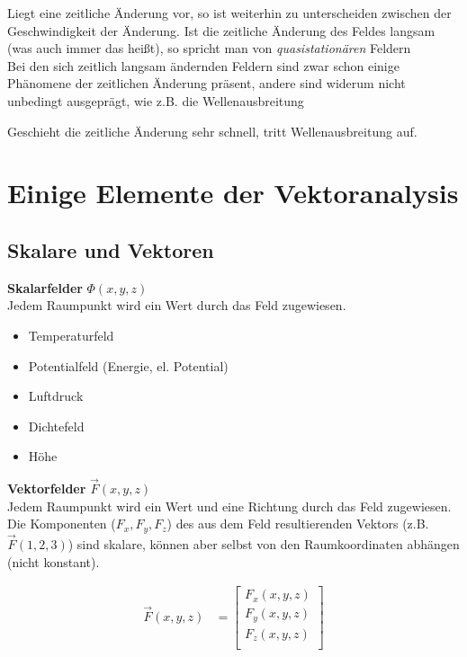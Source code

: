 \documentclass[11pt, a4paper]{article}
\begin{document}
Liegt eine zeitliche Änderung vor, so ist weiterhin zu unterscheiden zwischen der Geschwindigkeit der Änderung. Ist die zeitliche Änderung des Feldes langsam (was auch immer das heißt), so spricht man von \emph{quasistationären} Feldern\\

Bei den sich zeitlich langsam ändernden Feldern sind zwar schon einige Phänomene der zeitlichen Änderung präsent, andere sind widerum nicht unbedingt ausgeprägt, wie z.B.
die Wellenausbreitung

Geschieht die zeitliche Änderung sehr schnell, tritt Wellenausbreitung auf.

\section{Einige Elemente der Vektoranalysis}
\subsection{Skalare und Vektoren}

\textbf{Skalarfelder} $\Phi(x,y,z)$\\
Jedem Raumpunkt wird ein Wert durch das Feld zugewiesen.
\begin{itemize}
  \item Temperaturfeld
  \item Potentialfeld (Energie, el. Potential)
  \item Luftdruck
  \item Dichtefeld
  \item Höhe
\end{itemize}

\noindent \textbf{Vektorfelder} $\vec{F}(x,y,z)$\\
Jedem Raumpunkt wird ein Wert und eine Richtung durch das Feld zugewiesen.
Die Komponenten ($F_{x}, F_{y}, F_{z}$) des aus dem Feld resultierenden Vektors (z.B. $\vec{F}(1,2,3)$) sind
skalare, können aber selbst von den Raumkoordinaten abhängen (nicht konstant).

\begin{align*}
    \vec{F}(x, y, z) &= \begin{bmatrix}
           F_{x}(x,y,z)\\
           F_{y}(x,y,z)\\
           F_{z}(x,y,z)\\
         \end{bmatrix}
\end{align*}
\end{document}
